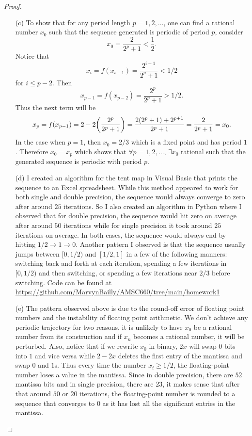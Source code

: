 \documentclass[12pt]{report}
\begin{document}
\begin{problem}
\begin{proof}
\begin{enumerate}
    \item [(c)]
    To show that for any period length $p = 1,2,\dots$, one can find a rational number $x_0$ such that the sequence generated is periodic of period $p$, consider
    \[
        x_0 = \frac{2}{2^p + 1} < \frac{1}{2}. 
    \]
    Notice that 
    \[
        x_i = f(x_{i-1}) = \frac{2^{i-1}}{2^p + 1} < 1/2 
    \] 
    for $i \leq p-2$. Then
    \[
        x_{p-1} = f(x_{p-2}) = \frac{2^p}{2^p + 1} > 1/2.
    \] 
    Thus the next term will be
    \[
        x_{p} = f(x_{p-1}) = 2 - 2{\left(\frac{2^p}{2^p + 1}\right)} = \frac{2(2^p + 1) + 2^{p+1}}{2^p+1} = \frac{2}{2^p+1} = x_0.
    \]
    In the case when $p=1$, then $x_0=2/3$ which is a fixed point and has period $1$. Therefore $x_0 = x_p$ which shows that $\forall p = 1,2,\dots$, $\exists x_0$ rational such that the generated sequence is periodic with period $p$. 

    \item [(d)]
    I created an algorithm for the tent map in Visual Basic that prints the sequence to an Excel spreadsheet. While this method appeared to work for both single and double precision, the sequence would always converge to zero after around $25$ iterations. So I also created an algorithm in Python where I observed that for double precision, the sequence would hit zero on average after around $50$ iterations while for single precision it took around $25$ iterations on average. In both cases, the sequence would always end by hitting $1/2 \to 1 \to 0$. Another pattern I observed is that the sequence usually jumps between $[0,1/2)$ and $[1/2,1]$ in a few of the following manners: switching back and forth at each iteration, spending a few iterations in $[0,1/2)$ and then switching, or spending a few iterations near $2/3$ before switching. Code can be found at \url{https://github.com/MarvynBailly/AMSC660/tree/main/homework1}

    \item [(e)]
    The pattern observed above is due to the round-off error of floating point numbers and the instability of floating point arithmetic. We don't achieve any periodic trajectory for two reasons, it is unlikely to have $x_0$ be a rational number from its construction and if $x_n$ becomes a rational number, it will be perturbed. Also, notice that if we rewrite $x_0$ in binary, $2x$ will swap $0$ bits into $1$ and vice versa while $2 - 2x$ deletes the first entry of the mantissa and swap $0$ and $1$s. Thus every time the number $x_i \geq 1/2$, the floating-point number loses a value in the mantissa. Since in double precision, there are $52$ mantissa bits and in single precision, there are $23$, it makes sense that after that around $50$ or $20$ iterations, the floating-point number is rounded to a sequence that converges to $0$ as it has lost all the significant entries in the mantissa.   


\end{enumerate}
\end{proof}
\end{problem}
\end{document}
